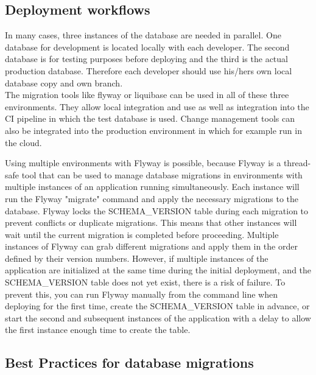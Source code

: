 \subsection{Deployment workflows}
%
In many cases, three instances of the database are needed in parallel. One database for development is located locally with each developer. The second database is for testing purposes before deploying and the third is the actual production database. Therefore each developer should use his/hers own local database copy and own branch.\\
The migration tools like flyway or liquibase can be used in all of these three environments. They allow local integration and use as well as integration into the CI pipeline in which the test database is used. Change management tools can also be integrated into the production environment in which for example run in the cloud. 

Using multiple environments with Flyway is possible, because Flyway is a thread-safe tool that can be used to manage database migrations in environments with multiple instances of an application running simultaneously. Each instance will run the Flyway "migrate" command and apply the necessary migrations to the database. Flyway locks the SCHEMA\_VERSION table during each migration to prevent conflicts or duplicate migrations. This means that other instances will wait until the current migration is completed before proceeding. Multiple instances of Flyway can grab different migrations and apply them in the order defined by their version numbers. However, if multiple instances of the application are initialized at the same time during the initial deployment, and the SCHEMA\_VERSION table does not yet exist, there is a risk of failure. To prevent this, you can run Flyway manually from the command line when deploying for the first time, create the SCHEMA\_VERSION table in advance, or start the second and subsequent instances of the application with a delay to allow the first instance enough time to create the table.




\subsection{Best Practices for database migrations \label{best_practices}}%
%

